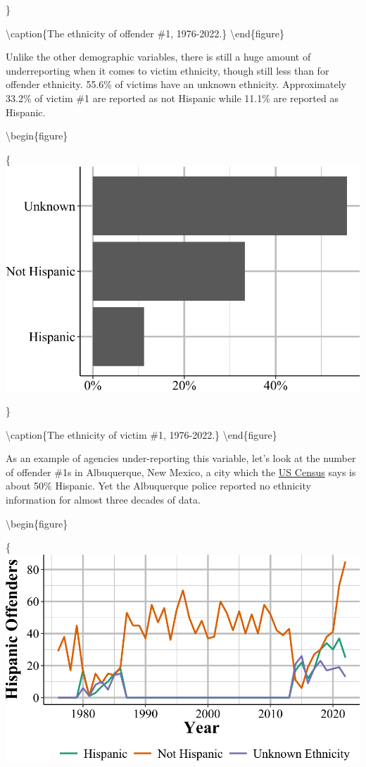 \documentclass[
  12pt,
  openany]{book}
\begin{document}
\}

\textbackslash caption\{The ethnicity of offender \#1, 1976-2022.\}\label{fig:shrOffenderEthnicity}
\textbackslash end\{figure\}

Unlike the other demographic variables, there is still a huge amount of underreporting when it comes to victim ethnicity, though still less than for offender ethnicity. 55.6\% of victims have an unknown ethnicity. Approximately 33.2\% of victim \#1 are reported as not Hispanic while 11.1\% are reported as Hispanic.

\textbackslash begin\{figure\}

\{\centering \includegraphics[width=0.9\linewidth]{06_shr_files/figure-latex/shrVictimEthnicity-1}

\}

\textbackslash caption\{The ethnicity of victim \#1, 1976-2022.\}\label{fig:shrVictimEthnicity}
\textbackslash end\{figure\}

As an example of agencies under-reporting this variable, let's look at the number of offender \#1s in Albuquerque, New Mexico, a city which the \href{https://www.census.gov/quickfacts/fact/table/albuquerquecitynewmexico,US/PST045222}{US Census} says is about 50\% Hispanic. Yet the Albuquerque police reported no ethnicity information for almost three decades of data.

\textbackslash begin\{figure\}

\{\centering \includegraphics[width=0.9\linewidth]{06_shr_files/figure-latex/ABQ-1}
\end{document}
